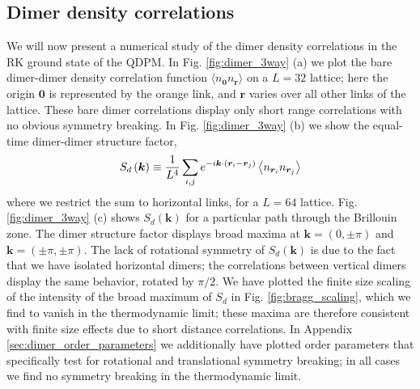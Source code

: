 \documentclass[twocolumn,prb,aps,floatfix,superscriptaddress]{revtex4-1}
\newcommand{\figref}[1]{Fig. \ref{#1}}
\newcommand{\appref}[1]{Appendix \ref{#1}}
\begin{document}
\subsection{Dimer density correlations}

We will now present a numerical study of the dimer density correlations in the RK ground state of the QDPM. In \figref{fig:dimer_3way} (a) we plot the bare dimer-dimer density correlation function $\langle n_{\bm{0}} n_{\bm{r}}\rangle$ on a $L=32$ lattice; here the origin $\bm{0}$ is represented by the orange link, and $\bm{r}$ varies over all other links of the lattice. These bare dimer correlations display only short range correlations with no obvious symmetry breaking. In \figref{fig:dimer_3way} (b) we show the equal-time dimer-dimer structure factor, 
\begin{equation}
S_d\left( \bm{k} \right) \equiv \frac{1}{ L^4} \sum_{i,j} e^{-i \bm{k} \cdot \left(\bm{r}_i - \bm{r}_j\right)} \left \langle n_{\bm{r}_i} n_{\bm{r}_j} \right \rangle  \notag
\end{equation}
where we restrict the sum to horizontal links, for a $L=64$ lattice. 
\figref{fig:dimer_3way} (c) shows $S_d(\bm{k})$ for a particular path through the Brillouin zone. The dimer structure factor displays broad maxima at $\bm{k} = (0, \pm \pi)$ and $\bm{k} = (\pm \pi, \pm \pi)$. The lack of rotational symmetry of $S_d(\bm{k})$ is due to the fact that we have isolated horizontal dimers; the correlations between vertical dimers display the same behavior, rotated by $\pi/2$.
We have plotted the finite size scaling of the intensity of the broad maximum of $S_d$ in  \figref{fig:bragg_scaling}, which we find to vanish in the thermodynamic limit; these maxima are therefore consistent with finite size effects due to short distance correlations. In \appref{sec:dimer_order_parameters} we additionally have plotted order parameters that specifically test for rotational and translational symmetry breaking; in all cases we find no symmetry breaking in the thermodynamic limit. 
\end{document}
